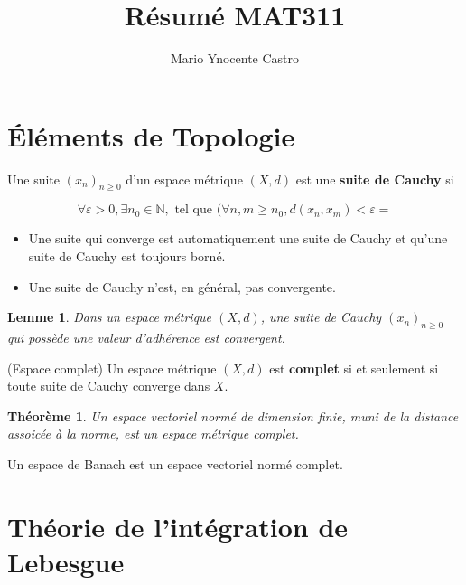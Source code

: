 \documentclass[10pt,a4paper,oneside]{article}
\newtheorem{theoreme}{Théorème}
\newtheorem{lemme}{Lemme}
\newenvironment{definition}[1][Definition]{\begin{trivlist}
\item[\hskip \labelsep {\bfseries #1}]}{\end{trivlist}}
\begin{document}
\title{Résumé MAT311}
\author{Mario Ynocente Castro}

\maketitle

\section{Éléments de Topologie}

\begin{definition}
Une suite $(x_n)_{n \geq 0}$ d'un espace métrique $(X,d)$ est une \textbf{suite de Cauchy} si

\[ \forall \varepsilon > 0, \exists n_0 \in \mathbb{N}, \text{ tel que } (\forall n,m \geq n_0, d(x_n,x_m) < \varepsilon= \]
\end{definition}

\begin{itemize}
\item
Une suite qui converge est automatiquement une suite de Cauchy et qu'une suite de Cauchy est toujours borné.
\item
Une suite de Cauchy n'est, en général, pas convergente.
\end{itemize}

\begin{lemme}
Dans un espace métrique $(X,d)$, une suite de Cauchy $(x_n)_{n \geq 0}$ qui possède une valeur d'adhérence est convergent.
\end{lemme}

\begin{definition}
(Espace complet)
Un espace métrique $(X,d)$ est \textbf{complet} si et seulement si toute suite de Cauchy converge dans $X$.
\end{definition}

\begin{theoreme}
Un espace vectoriel normé de dimension finie, muni de la distance assoicée à la norme, est un espace métrique complet.
\end{theoreme}

\begin{definition}
Un espace de Banach est un espace vectoriel normé complet.
\end{definition}

\section{Théorie de l'intégration de Lebesgue}
\end{document}
